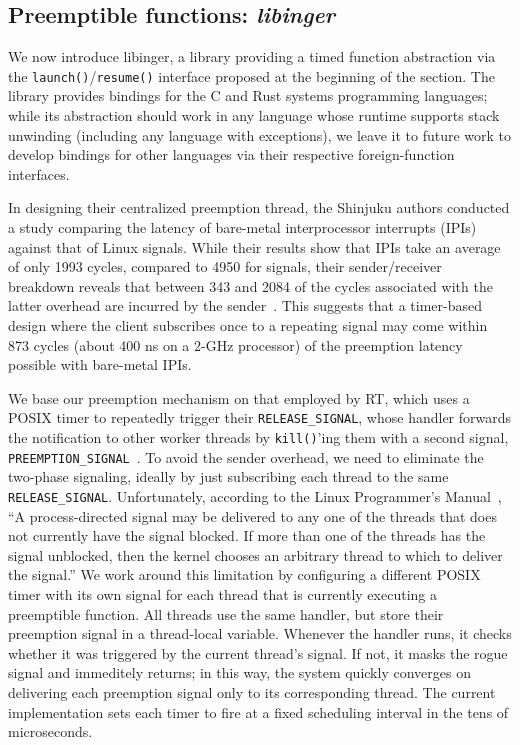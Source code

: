 \subsection{Preemptible functions: \textit{libinger}}
\label{sec:libinger}

We now introduce libinger, a library providing a timed function abstraction via the
\texttt{launch()}/\texttt{resume()} interface proposed at the beginning of the
section.  The library provides bindings for the C and Rust systems programming
languages; while its abstraction should work in any language whose runtime supports
stack unwinding (including any language with exceptions), we leave it to future work
to develop bindings for other languages via their respective foreign-function
interfaces.

In designing their centralized preemption thread, the Shinjuku authors conducted a
study comparing the latency of bare-metal interprocessor interrupts (IPIs) against
that of Linux signals.  While their results show that IPIs take an average of only
1993 cycles, compared to 4950 for signals, their sender/receiver breakdown reveals
that between 343 and 2084 of the cycles associated with the latter overhead are
incurred by the sender~\cite{Kaffes:nsdi2019}.  This suggests that a timer-based
design where the client subscribes once to a repeating signal may come within 873
cycles (about 400 ns on a 2-GHz processor) of the preemption latency possible with
bare-metal IPIs.

We base our preemption mechanism on that employed by RT, which uses a POSIX timer to
repeatedly trigger their \texttt{RELEASE\_SIGNAL}, whose handler forwards the
notification to other worker threads by \texttt{kill()}'ing them with a second
signal, \texttt{PREEMPTION\_SIGNAL}~\cite{mollison:rtas2013}.  To avoid the sender
overhead, we need to eliminate the two-phase signaling, ideally by just subscribing
each thread to the same \texttt{RELEASE\_SIGNAL}.  Unfortunately, according to the
Linux Programmer's Manual~\cite{signal-manpage}, ``A process-directed signal may be
delivered to any one of the threads that does not currently have the signal blocked.
If more than one of the threads has the signal unblocked, then the kernel chooses an
arbitrary thread to which to deliver the signal.''  We work around this limitation by
configuring a different POSIX timer with its own signal for each thread that is
currently executing a preemptible function.  All threads use the same handler, but
store their preemption signal in a thread-local variable.  Whenever the handler runs,
it checks whether it was triggered by the current thread's signal.  If not, it masks
the rogue signal and immeditely returns; in this way, the system quickly converges on
delivering each preemption signal only to its corresponding thread.  The current
implementation sets each timer to fire at a fixed scheduling interval in the tens of
microseconds.

